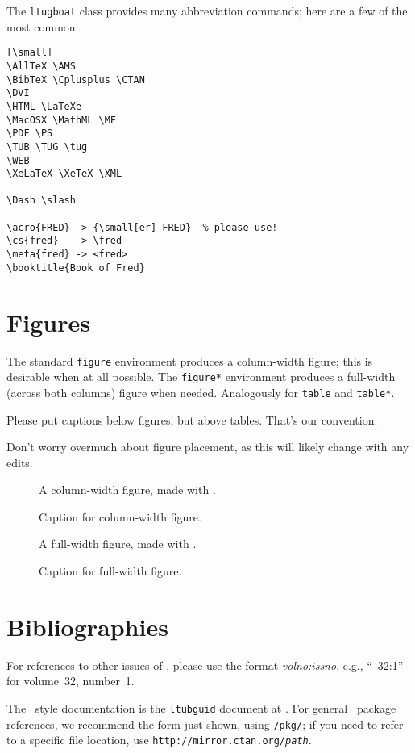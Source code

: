 \documentclass{ltugboat}
\begin{document}
The \texttt{ltugboat} class provides many abbreviation commands; here
are a few of the most common:

\begin{verbatim}[\small]
\AllTeX \AMS
\BibTeX \Cplusplus \CTAN
\DVI
\HTML \LaTeXe
\MacOSX \MathML \MF
\PDF \PS
\TUB \TUG \tug
\WEB
\XeLaTeX \XeTeX \XML

\Dash \slash

\acro{FRED} -> {\small[er] FRED}  % please use!
\cs{fred}   -> \fred
\meta{fred} -> <fred>
\booktitle{Book of Fred}
\end{verbatim}

\section{Figures}

The standard \texttt{figure} environment produces a column-width figure;
this is desirable when at all possible. The \texttt{figure*} environment
produces a full-width (across both columns) figure when needed.
Analogously for \texttt{table} and \texttt{table*}. 

Please put captions below figures, but above tables. That's our
convention.

Don't worry overmuch about figure placement, as this will likely change
with any edits.

\begin{figure}
A column-width figure, made with .
\caption{Caption for column-width figure.}
\label{fig.colwidth}
\end{figure}

\begin{figure*}
A full-width figure, made with .
\caption{Caption for full-width figure.}
\label{fig.fullwidth}
\end{figure*}

\section{Bibliographies}

For references to other issues of \TUB, please use the format
\textsl{volno:issno}, e.g., ``\TUB\ 32:1'' for volume~32, number~1.

The \TUB\ style documentation is the \texttt{ltubguid} document at
. For general \CTAN\ package references, we
recommend the form just shown, using \texttt{/pkg/}; if you need to
refer to a specific file location, use
\texttt{http://mirror.ctan.org/\textsl{path}}.
\end{document}
